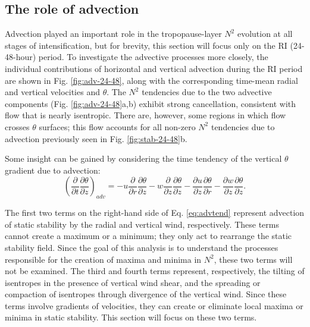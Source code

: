 \documentclass{ametsoc}
\begin{document}
  \subsection{The role of advection}

Advection played an important role in the tropopause-layer $N^2$ evolution at all stages of intensification, but for brevity, this section will focus only on the RI (24-48-hour) period.
To investigate the advective processes more closely, the individual contributions of horizontal and vertical advection during the RI period are shown in Fig. \ref{fig:adv-24-48}, along with the corresponding time-mean radial and vertical velocities and $\theta$.
The $N^2$ tendencies due to the two advective components (Fig. \ref{fig:adv-24-48}a,b) exhibit strong cancellation, consistent with flow that is nearly isentropic.
There are, however, some regions in which flow crosses $\theta$ surfaces; this flow accounts for all non-zero $N^2$ tendencies due to advection previously seen in Fig. \ref{fig:stab-24-48}b.

Some insight can be gained by considering the time tendency of the vertical $\theta$ gradient due to advection:
   \begin{equation} \label{eq:advtend}
   \left(\frac{\partial}{\partial t}\frac{\partial \theta}{\partial z}\right)_{adv} = -u\frac{\partial}{\partial r}\frac{\partial \theta}{\partial z}-w\frac{\partial}{\partial z}\frac{\partial \theta}{\partial z}-\frac{\partial u}{\partial z}\frac{\partial \theta}{\partial r}-\frac{\partial w}{\partial z}\frac{\partial \theta}{\partial z}.
   \end{equation}

The first two terms on the right-hand side of Eq. \ref{eq:advtend} represent advection of static stability by the radial and vertical wind, respectively.
These terms cannot create a maximum or a minimum; they only act to rearrange the static stability field.
Since the goal of this analysis is to understand the processes responsible for the creation of maxima and minima in $N^2$, these two terms will not be examined.
The third and fourth terms represent, respectively, the tilting of isentropes in the presence of vertical wind shear, and the spreading or compaction of isentropes through divergence of the vertical wind.
Since these terms involve gradients of velocities, they can create or eliminate local maxima or minima in static stability. This section will focus on these two terms.
\end{document}
